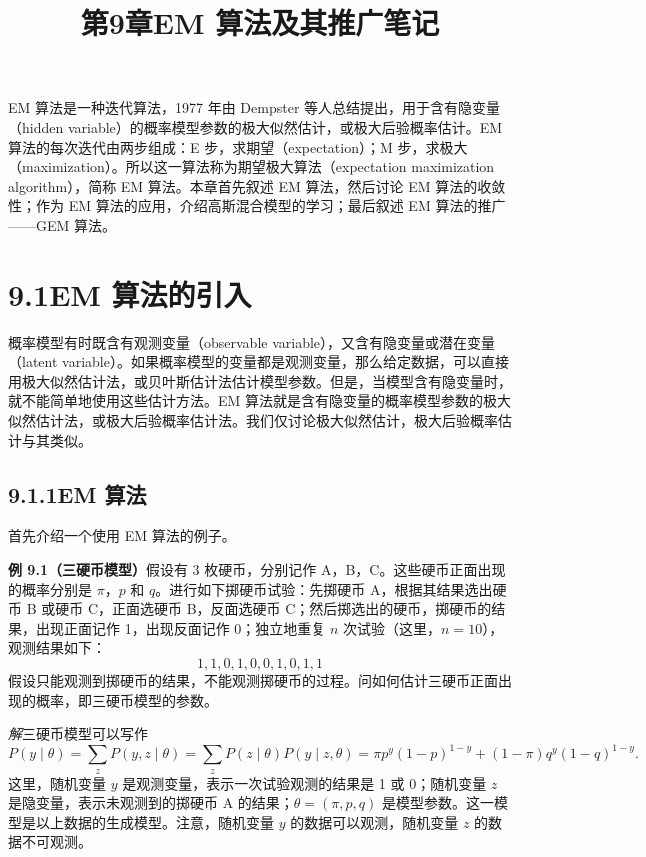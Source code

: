 \documentclass[UTF8,12pt,a4paper,fontset=fandol]{ctexart}
\title{第9章\quad EM 算法及其推广笔记}
\author{}
\date{}
\begin{document}
\maketitle

EM 算法是一种迭代算法，1977 年由 Dempster 等人总结提出，用于含有隐变量（hidden variable）的概率模型参数的极大似然估计，或极大后验概率估计。EM 算法的每次迭代由两步组成：E 步，求期望（expectation）；M 步，求极大（maximization）。所以这一算法称为期望极大算法（expectation maximization algorithm），简称 EM 算法。本章首先叙述 EM 算法，然后讨论 EM 算法的收敛性；作为 EM 算法的应用，介绍高斯混合模型的学习；最后叙述 EM 算法的推广——GEM 算法。

\section*{9.1\quad EM 算法的引入}

概率模型有时既含有观测变量（observable variable），又含有隐变量或潜在变量（latent variable）。如果概率模型的变量都是观测变量，那么给定数据，可以直接用极大似然估计法，或贝叶斯估计法估计模型参数。但是，当模型含有隐变量时，就不能简单地使用这些估计方法。EM 算法就是含有隐变量的概率模型参数的极大似然估计法，或极大后验概率估计法。我们仅讨论极大似然估计，极大后验概率估计与其类似。

\subsection*{9.1.1\quad EM 算法}

首先介绍一个使用 EM 算法的例子。

\noindent\textbf{例 9.1（三硬币模型）}\quad 假设有 3 枚硬币，分别记作 A，B，C。这些硬币正面出现的概率分别是 $\pi$，$p$ 和 $q$。进行如下掷硬币试验：先掷硬币 A，根据其结果选出硬币 B 或硬币 C，正面选硬币 B，反面选硬币 C；然后掷选出的硬币，掷硬币的结果，出现正面记作 1，出现反面记作 0；独立地重复 $n$ 次试验（这里，$n=10$），观测结果如下：
\[
  1,1,0,1,0,0,1,0,1,1
\]
假设只能观测到掷硬币的结果，不能观测掷硬币的过程。问如何估计三硬币正面出现的概率，即三硬币模型的参数。

\noindent\textit{解}\quad 三硬币模型可以写作
\begin{equation}
  P(y\mid\theta)=\sum_z P(y,z\mid\theta)=\sum_z P(z\mid\theta)P(y\mid z,\theta)
  =\pi p^y(1-p)^{1-y}+(1-\pi)q^y(1-q)^{1-y}.
  \tag{9.1}
\end{equation}
这里，随机变量 $y$ 是观测变量，表示一次试验观测的结果是 1 或 0；随机变量 $z$ 是隐变量，表示未观测到的掷硬币 A 的结果；$\theta=(\pi,p,q)$ 是模型参数。这一模型是以上数据的生成模型。注意，随机变量 $y$ 的数据可以观测，随机变量 $z$ 的数据不可观测。
\end{document}
